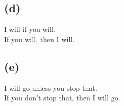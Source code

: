 \documentclass[11pt]{article}
\begin{document}
\subsection*{(d)}
\begin{center}
I will if you will.\\
\hfill \break
If you will, then I will.
\end{center}

\subsection*{(e)}
\begin{center}
I will go unless you stop that.\\
\hfill \break
If you don't stop that, then I will go.
\end{center}
\end{document}
